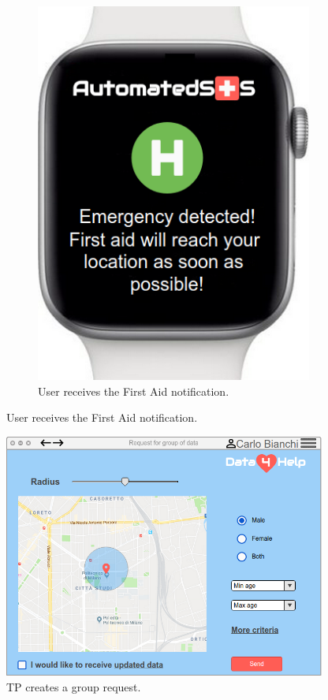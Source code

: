 \begin{figure}[ht]
\begin{subfigure}[ht]{0.38\linewidth}
    \includegraphics[width=\linewidth]{images/Mock-up/Wearable_2.png}
    \caption{User receives the First Aid notification.}
  \end{subfigure}
\end{figure}

\begin{figure}[ht]
    \renewcommand{\thefigure}{\alph{figure}}
    \centering
    \addtocounter{figure}{5}
    \captionsetup{labelformat=parens, labelsep=space, name=}
    \includegraphics[width=300pt]{images/Mock-up/Third_Party_req_WP.png}
    \caption{TP creates a group request.}
\end{figure}

